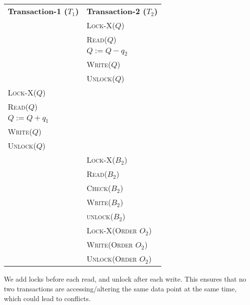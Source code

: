 \begin{center}
    \begin{adjustbox}{width=\textwidth}
        \begin{tabularx}{\textwidth}{|X|X|}
        \hline
        \multirow{2}{*}{\textbf{Transaction-1 ($T_{1}$)}} & \multirow{2}{*}{\textbf{Transaction-2 ($T_{2}$)}} \\
        & \\ \hline
        & \textsc{Lock-X($Q$)} \\
        & \textsc{Read($Q$)} \\
        & \textsc{$Q := Q - q_{2}$} \\
        & \textsc{Write($Q$)} \\
        & \textsc{Unlock($Q$)} \\
        \textsc{Lock-X($Q$)} & \\
        \textsc{Read($Q$)} & \\
        \textsc{$Q := Q + q_{1}$} & \\
        \textsc{Write($Q$)} & \\
        \textsc{Unlock($Q$)} & \\
        & \textsc{Lock-X($B_{2}$)} \\
        & \textsc{Read($B_{2}$)} \\
        & \textsc{Check($B_{2}$)} \\
        & \textsc{Write($B_{2}$)} \\
        & \textsc{unlock($B_{2}$)} \\
        & \textsc{Lock-X(Order $O_{2}$)} \\
        & \textsc{Write(Order $O_{2}$)} \\
        & \textsc{Unlock(Order $O_{2}$)} \\
        \hline
        \end{tabularx}
    \end{adjustbox}
\end{center}
\vspace*{10pt}
We add locks before each read, and unlock after each write. This ensures that no two
transactions are accessing/altering the same data point at the same time, which could
lead to conflicts.